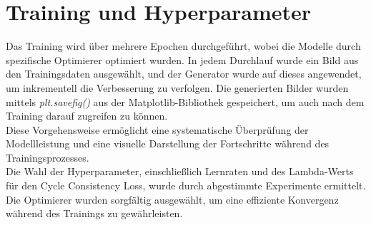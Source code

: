 



\section{Training und Hyperparameter}
Das Training wird über mehrere Epochen durchgeführt, wobei die Modelle durch spezifische Optimierer optimiert wurden. In jedem Durchlauf wurde ein Bild aus den Trainingsdaten ausgewählt, und der Generator wurde auf dieses angewendet, um inkrementell die Verbesserung zu verfolgen. Die generierten Bilder wurden mittels \textit{plt.savefig()} aus der Matplotlib-Bibliothek gespeichert, um auch nach dem Training darauf zugreifen zu können.\\
Diese Vorgehensweise ermöglicht eine systematische Überprüfung der Modellleistung und eine visuelle Darstellung der Fortschritte während des Trainingsprozesses.
\\
Die Wahl der Hyperparameter, einschließlich Lernraten und des Lambda-Werts für den Cycle Consistency Loss, wurde durch abgestimmte Experimente ermittelt. Die Optimierer wurden sorgfältig ausgewählt, um eine effiziente Konvergenz während des Trainings zu gewährleisten.